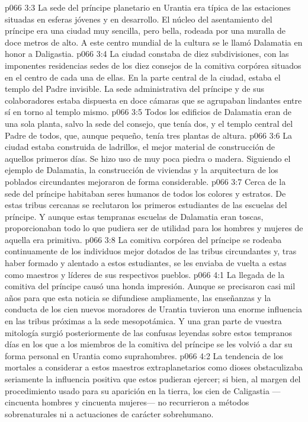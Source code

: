 \vs p066 3:3 \pc La sede del príncipe planetario en Urantia era típica de las estaciones situadas en esferas jóvenes y en desarrollo. El núcleo del asentamiento del príncipe era una ciudad muy sencilla, pero bella, rodeada por una muralla de doce metros de alto. A este centro mundial de la cultura se le llamó Dalamatia en honor a Daligastia.
\vs p066 3:4 La ciudad constaba de diez subdivisiones, con las imponentes residencias sedes de los diez consejos de la comitiva corpórea situados en el centro de cada una de ellas. En la parte central de la ciudad, estaba el templo del Padre invisible. La sede administrativa del príncipe y de sus colaboradores estaba dispuesta en doce cámaras que se agrupaban lindantes entre sí en torno al templo mismo.
\vs p066 3:5 Todos los edificios de Dalamatia eran de una sola planta, salvo la sede del consejo, que tenía dos, y el templo central del Padre de todos, que, aunque pequeño, tenía tres plantas de altura.
\vs p066 3:6 La ciudad estaba construida de ladrillos, el mejor material de construcción de aquellos primeros días. Se hizo uso de muy poca piedra o madera. Siguiendo el ejemplo de Dalamatia, la construcción de viviendas y la arquitectura de los poblados circundantes mejoraron de forma considerable.
\vs p066 3:7 \pc Cerca de la sede del príncipe habitaban seres humanos de todos los colores y estratos. De estas tribus cercanas se reclutaron los primeros estudiantes de las escuelas del príncipe. Y aunque estas tempranas escuelas de Dalamatia eran toscas, proporcionaban todo lo que pudiera ser de utilidad para los hombres y mujeres de aquella era primitiva.
\vs p066 3:8 La comitiva corpórea del príncipe se rodeaba continuamente de los individuos mejor dotados de las tribus circundantes y, tras haber formado y alentado a estos estudiantes, se les enviaba de vuelta a estas como maestros y líderes de sus respectivos pueblos.
\vs p066 4:1 La llegada de la comitiva del príncipe causó una honda impresión. Aunque se precisaron casi mil años para que esta noticia se difundiese ampliamente, las enseñanzas y la conducta de los cien nuevos moradores de Urantia tuvieron una enorme influencia en las tribus próximas a la sede mesopotámica. Y una gran parte de vuestra mitología surgió posteriormente de las confusas leyendas sobre estos tempranos días en los que a los miembros de la comitiva del príncipe se les volvió a dar su forma personal en Urantia como suprahombres.
\vs p066 4:2 La tendencia de los mortales a considerar a estos maestros extraplanetarios como dioses obstaculizaba seriamente la influencia positiva que estos pudieran ejercer; si bien, al margen del procedimiento usado para su aparición en la tierra, los cien de Caligastia ---cincuenta hombres y cincuenta mujeres--- no recurrieron a métodos sobrenaturales ni a actuaciones de carácter sobrehumano.
